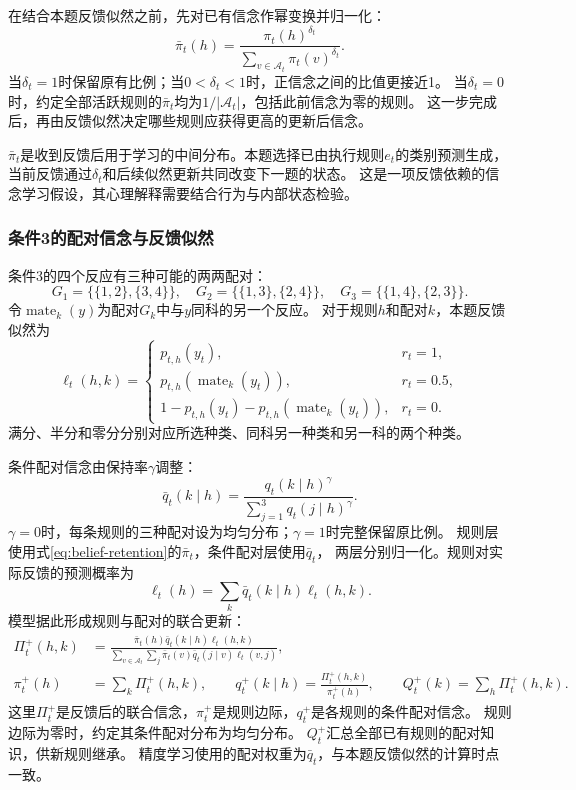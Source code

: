 \documentclass[11pt,a4paper]{article}
\numberwithin{equation}{section}
\newcommand{\A}{\mathcal{A}}
\begin{document}
在结合本题反馈似然之前，先对已有信念作幂变换并归一化：
\begin{equation}
\bar\pi_t(h)=\frac{\pi_t(h)^{\delta_t}}
{\sum_{v\in\A_t}\pi_t(v)^{\delta_t}}.
\label{eq:belief-retention}
\end{equation}
当$\delta_t=1$时保留原有比例；当$0<\delta_t<1$时，正信念之间的比值更接近1。
当$\delta_t=0$时，约定全部活跃规则的$\bar\pi_t$均为$1/|\A_t|$，包括此前信念为零的规则。
这一步完成后，再由反馈似然决定哪些规则应获得更高的更新后信念。

$\bar\pi_t$是收到反馈后用于学习的中间分布。本题选择已由执行规则$e_t$的类别预测生成，
当前反馈通过$\delta_t$和后续似然更新共同改变下一题的状态。
这是一项反馈依赖的信念学习假设，其心理解释需要结合行为与内部状态检验。

\subsubsection{条件3的配对信念与反馈似然}
\label{sec:pairing}
条件3的四个反应有三种可能的两两配对：
\begin{equation}
G_1=\{\{1,2\},\{3,4\}\},\quad G_2=\{\{1,3\},\{2,4\}\},\quad
G_3=\{\{1,4\},\{2,3\}\}.
\end{equation}
令$\operatorname{mate}_k(y)$为配对$G_k$中与$y$同科的另一个反应。
对于规则$h$和配对$k$，本题反馈似然为
\begin{equation}
\ell_t(h,k)=\begin{cases}
p_{t,h}(y_t),&r_t=1,\\
p_{t,h}(\operatorname{mate}_k(y_t)),&r_t=0.5,\\
1-p_{t,h}(y_t)-p_{t,h}(\operatorname{mate}_k(y_t)),&r_t=0.
\end{cases}
\label{eq:pair-likelihood}
\end{equation}
满分、半分和零分分别对应所选种类、同科另一种类和另一科的两个种类。


条件配对信念由保持率$\gamma$调整：
\begin{equation}
\bar q_t(k\mid h)=\frac{q_t(k\mid h)^\gamma}
{\sum_{j=1}^3q_t(j\mid h)^\gamma}.
\label{eq:pair-forgetting}
\end{equation}
$\gamma=0$时，每条规则的三种配对设为均匀分布；$\gamma=1$时完整保留原比例。
规则层使用式\eqref{eq:belief-retention}的$\bar\pi_t$，条件配对层使用$\bar q_t$，
两层分别归一化。规则对实际反馈的预测概率为
\begin{equation}
\ell_t(h)=\sum_k\bar q_t(k\mid h)\ell_t(h,k).
\label{eq:marginal-likelihood}
\end{equation}
模型据此形成规则与配对的联合更新：
\begin{align}
\Pi_t^+(h,k)&=
\frac{\bar\pi_t(h)\bar q_t(k\mid h)\ell_t(h,k)}
{\sum_{v\in\A_t}\sum_j\bar\pi_t(v)\bar q_t(j\mid v)\ell_t(v,j)},\\
\pi_t^+(h)&=\sum_k\Pi_t^+(h,k),\qquad
q_t^+(k\mid h)=\frac{\Pi_t^+(h,k)}{\pi_t^+(h)},\qquad
Q_t^+(k)=\sum_h\Pi_t^+(h,k).
\label{eq:pair-update}
\end{align}
这里$\Pi_t^+$是反馈后的联合信念，$\pi_t^+$是规则边际，$q_t^+$是各规则的条件配对信念。
规则边际为零时，约定其条件配对分布为均匀分布。
$Q_t^+$汇总全部已有规则的配对知识，供新规则继承。
精度学习使用的配对权重为$\bar q_t$，与本题反馈似然的计算时点一致。
\end{document}
